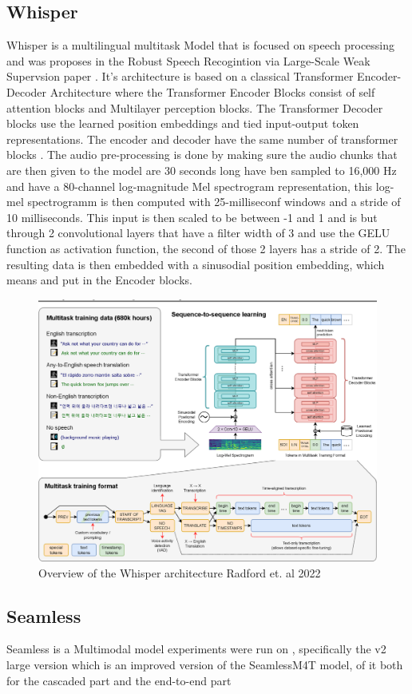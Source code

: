 \subsection{Whisper}
Whisper is a multilingual multitask Model that is focused on speech processing and was proposes in the Robust Speech Recogintion via Large-Scale Weak Supervsion paper \cite{radford2022robust}. 
It's architecture is based on a classical Transformer Encoder-Decoder Architecture where the Transformer Encoder Blocks consist of self attention blocks and Multilayer perception blocks. 
The Transformer Decoder blocks use the learned position embeddings and tied input-output token representations. 
The encoder and decoder have the same number of transformer blocks .
The audio pre-processing is done by making sure the audio chunks that are then given to the model are 30 seconds long have ben sampled to 16,000 Hz and have a 80-channel log-magnitude Mel spectrogram representation, this log-mel spectrogramm is then computed with 25-milliseconf windows and a stride of 10 milliseconds. 
This input is then scaled to be between -1 and 1 and is but through 2 convolutional layers that have a filter width of 3 and use the GELU function as activation function, the second of those 2 layers has a stride of 2. 
The resulting data is then embedded with a sinusodial position embedding, which means %
and put in the Encoder blocks. 

\begin{figure}
        \centering
        \includegraphics[width=0.5\linewidth]{Latex//sections//images/whispermodel.png}
        \caption{Overview of the Whisper architecture Radford et. al 2022}
        \label{fig:whispermodel}
    \end{figure}

\subsection{Seamless}

Seamless is a Multimodal model 
experiments were run on \cite{seamless2023}, specifically the v2 large version which is an improved version of the SeamlessM4T model, 
of it both for the cascaded part and the end-to-end part

